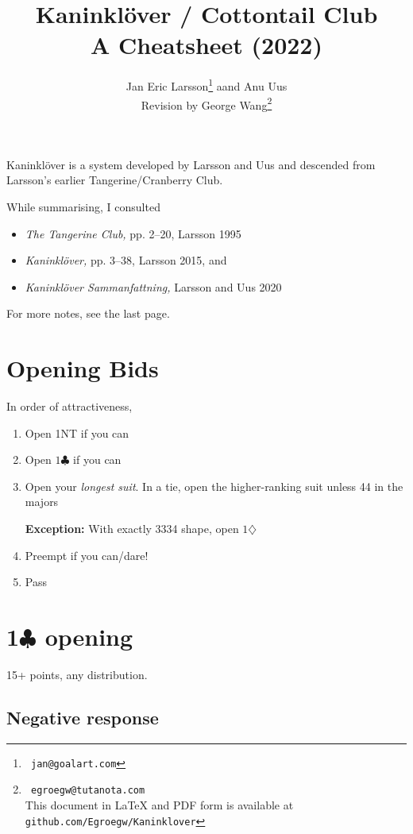 \documentclass[a4paper, twoside, 11pt]{article}
\title{Kaninklöver / Cottontail Club\\A Cheatsheet (2022)}
\author{
Jan Eric Larsson\footnote{\normalsize{\texttt{ jan@goalart.com}}} \hphantom aand Anu Uus \\
Revision by George Wang\footnote{\normalsize{\texttt{ egroegw@tutanota.com} \\
This document  in LaTeX and PDF form is available at \texttt{github.com/Egroegw/Kaninklover}}}
}
\date{}
\begin{document}
\maketitle

\vspace{0cm}
\begin{multicols}{3}

\itshape

Kaninklöver is a system developed by Larsson and Uus and descended from Larsson's earlier Tangerine/Cranberry Club.

While summarising, I consulted
\begin{itemize}
    \item \emph{The Tangerine Club,} pp. 2--20, Larsson 1995
    \item \emph{Kaninklöver,} pp. 3--38, Larsson 2015, and
    \item \emph{Kaninklöver Sammanfattning,} Larsson and Uus 2020
\end{itemize}

For more notes, see the last page.

\upshape
\section{Opening Bids}
In order of attractiveness,
\begin{enumerate}
    \item Open \textnormal{1NT} if you can
    \item Open $1\clubsuit$ if you can
    \item Open your \textit{longest suit}.
    In a tie, open the higher-ranking suit unless 44 in the majors

     \textbf{Exception:} With exactly 3334 shape, open $1\diamondsuit$
    \item Preempt if you can/dare!
    \item Pass
\end{enumerate}



\section{1$\clubsuit$ opening}

15+ points, any distribution.


\subsection*{Negative response}


\end{multicols}
\end{document}
